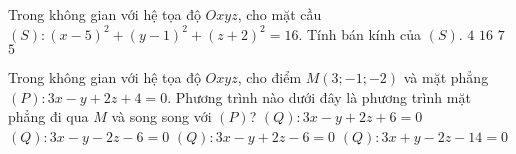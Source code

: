 \begin{ex}%
Trong không gian với hệ tọa độ $Oxyz$, cho mặt cầu $\left(S \right): \left( x-5 \right)^2+\left( y-1 \right)^2+\left( z+2 \right)^2=16$. Tính bán kính của $\left( S \right)$.
	\choice
	{\True $4$ }
	{$16$}
	{ $7$}
	{$5$ }
\end{ex}

\begin{ex}%
Trong không gian với hệ tọa độ $Oxyz$, cho điểm $M\left( 3;-1;-2 \right)$ và mặt phẳng $\left( P \right):3x-y+2z+4=0$. Phương trình nào dưới đây là phương trình mặt phẳng đi qua $M$ và song song với $\left( P \right)$?	
	\choice
	{ $\left( Q \right):3x-y+2z+6=0$ }
	{$\left( Q \right):3x-y-2z-6=0$}
	{\True $\left( Q \right):3x-y+2z-6=0$ }
	{$\left( Q \right):3x+y-2z-14=0$ }
\end{ex}


